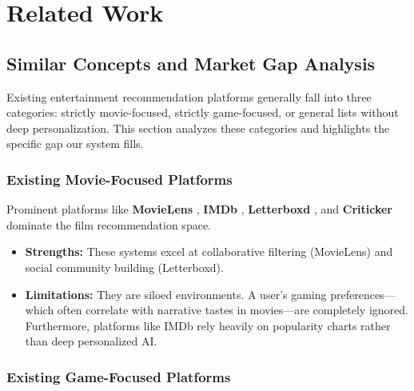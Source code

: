 
\chapter{Related Work}

\label{chap:related_work}



\section{Similar Concepts and Market Gap Analysis}

\label{sec:similar_concepts}



Existing entertainment recommendation platforms generally fall into three categories: strictly movie-focused, strictly game-focused, or general lists without deep personalization. This section analyzes these categories and highlights the specific gap our system fills.



\subsection{Existing Movie-Focused Platforms}

Prominent platforms like \textbf{MovieLens} \cite{movielens_site}, \textbf{IMDb} \cite{imdb_site}, \textbf{Letterboxd} \cite{letterboxd_site}, and \textbf{Criticker} \cite{criticker_site} dominate the film recommendation space.

\begin{itemize}

    \item \textbf{Strengths:} These systems excel at collaborative filtering (MovieLens) and social community building (Letterboxd).

    \item \textbf{Limitations:} They are siloed environments. A user's gaming preferences—which often correlate with narrative tastes in movies—are completely ignored. Furthermore, platforms like IMDb rely heavily on popularity charts rather than deep personalized AI.

\end{itemize}



\subsection{Existing Game-Focused Platforms}

